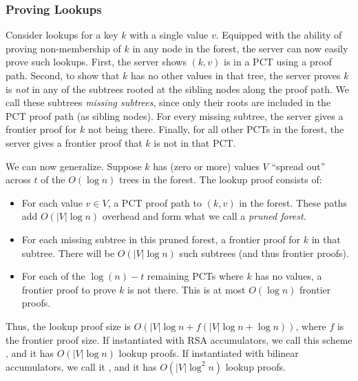 \subsubsection{Proving Lookups}
\label{s:aad:from-acc:short:lookup-proofs}
Consider lookups for a key $k$ with a single value $v$.
Equipped with the ability of proving non-membership of $k$ in any node in the forest, the server can now easily prove such lookups.
First, the server shows $(k,v)$ is in a PCT using a proof path.
Second, to show that $k$ has no other values in that tree, the server proves $k$ is \textit{not} in any of the subtrees rooted at the sibling nodes along the proof path.
We call these subtrees \textit{missing subtrees}, since only their roots are included in the PCT proof path (as sibling nodes).
For every missing subtree, the server gives a frontier proof for $k$ not being there.
Finally, for all other PCTs in the forest, the server gives a frontier proof that $k$ is not in that PCT.

We can now generalize.
Suppose $k$ has (zero or more) values $V$ ``spread out'' across $t$ of the $O(\log{n})$ trees in the forest.
The lookup proof consists of:
\begin{itemize}
    \item For each value $v\in V$, a PCT proof path to $(k,v)$ in the forest. These paths add $O(|V|\log{n})$ overhead and form what we call a \textit{pruned forest}.
    \item For each missing subtree in this pruned forest, a frontier proof for $k$ in that subtree. There will be $O(|V|\log{n})$ such subtrees (and thus frontier proofs).
    \item For each of the $\log{(n)}-t$ remaining PCTs where $k$ has no values, a frontier proof to prove $k$ is not there. This is at most $O(\log{n})$ frontier proofs.
\end{itemize}
Thus, the lookup proof size is $O\left(|V|\log{n} + f(|V|\log{n} + \log{n})\right)$, where $f$ is the frontier proof size.
If instantiated with RSA accumulators, we call this scheme \rsaaadset, and it has $O(|V|\log{n})$ lookup proofs.
If instantiated with bilinear accumulators, we call it \biaadset, and it has $O(|V|\log^2{n})$ lookup proofs.

